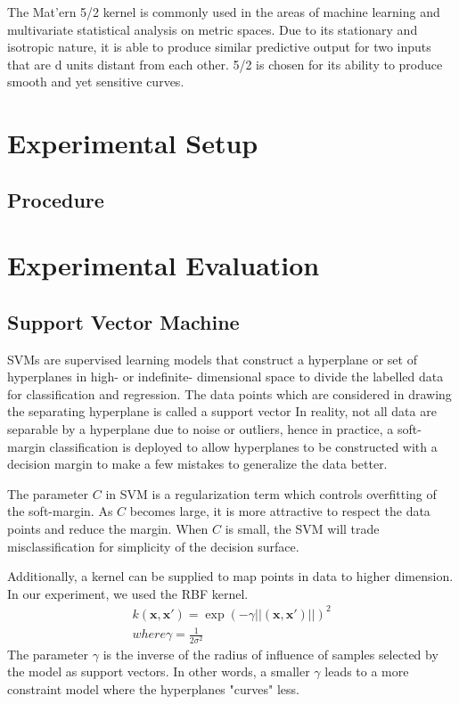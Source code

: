 \documentclass[letterpaper]{article}
\begin{document}
The Mat'ern 5/2 kernel is commonly used in the areas of machine learning and multivariate statistical analysis on metric spaces. Due to its stationary and isotropic nature, it is able to produce similar predictive output for two inputs that are d units distant from each other. 5/2 is chosen for its ability to produce smooth and yet sensitive curves.

\section{Experimental Setup}

\subsection{Procedure}

\section{Experimental Evaluation}

\subsection{Support Vector Machine}
SVMs are supervised learning models that construct a hyperplane or set of hyperplanes in high-
or indefinite- dimensional space to divide the labelled data for classification and regression.
The data points which are considered in drawing the separating hyperplane is called a support
vector In reality, not all data are separable by a hyperplane due to noise or outliers, hence in
practice, a soft-margin classification is deployed to allow hyperplanes to be constructed
with a decision margin to make a few mistakes to generalize the data better.

The parameter $\textit{C}$ in SVM is a regularization term which controls overfitting of the soft-margin.
As $\textit{C}$ becomes large, it is more attractive to respect the data points and reduce
the margin. When $\textit{C}$ is small, the SVM will trade misclassification for simplicity
of the decision surface.

Additionally, a kernel can be supplied to map points in data to higher dimension. In our
experiment, we used the RBF kernel.
\begin{align*}
  k (\textbf{x},\textbf{x}') = \exp(-\gamma||(\textbf{x},\textbf{x}')||)^2 \\
  where \gamma = \frac{1}{2\sigma^2}
\end{align*}
The parameter $\gamma$ is the inverse of the radius of influence of samples selected by the
model as support vectors. In other words, a smaller $\gamma$ leads to a more constraint
model where the hyperplanes "curves" less.
\end{document}
